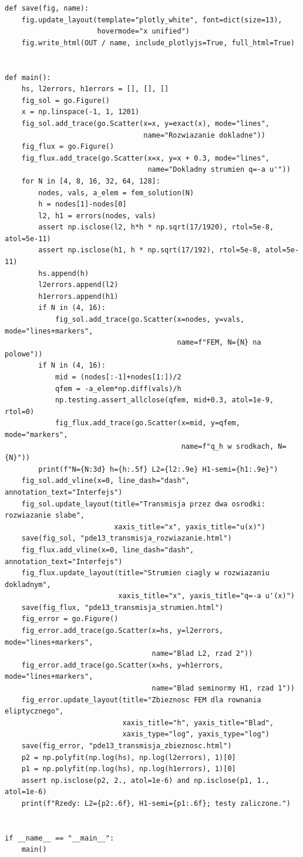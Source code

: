 \begin{lstlisting}[style=pythonpde,caption={Transmisja i zbieżność metody Galerkina (Plotly)},label={code:pde13-transmission}]
def save(fig, name):
    fig.update_layout(template="plotly_white", font=dict(size=13),
                      hovermode="x unified")
    fig.write_html(OUT / name, include_plotlyjs=True, full_html=True)


def main():
    hs, l2errors, h1errors = [], [], []
    fig_sol = go.Figure()
    x = np.linspace(-1, 1, 1201)
    fig_sol.add_trace(go.Scatter(x=x, y=exact(x), mode="lines",
                                 name="Rozwiazanie dokladne"))
    fig_flux = go.Figure()
    fig_flux.add_trace(go.Scatter(x=x, y=x + 0.3, mode="lines",
                                  name="Dokladny strumien q=-a u'"))
    for N in [4, 8, 16, 32, 64, 128]:
        nodes, vals, a_elem = fem_solution(N)
        h = nodes[1]-nodes[0]
        l2, h1 = errors(nodes, vals)
        assert np.isclose(l2, h*h * np.sqrt(17/1920), rtol=5e-8, atol=5e-11)
        assert np.isclose(h1, h * np.sqrt(17/192), rtol=5e-8, atol=5e-11)
        hs.append(h)
        l2errors.append(l2)
        h1errors.append(h1)
        if N in (4, 16):
            fig_sol.add_trace(go.Scatter(x=nodes, y=vals, mode="lines+markers",
                                         name=f"FEM, N={N} na polowe"))
        if N in (4, 16):
            mid = (nodes[:-1]+nodes[1:])/2
            qfem = -a_elem*np.diff(vals)/h
            np.testing.assert_allclose(qfem, mid+0.3, atol=1e-9, rtol=0)
            fig_flux.add_trace(go.Scatter(x=mid, y=qfem, mode="markers",
                                          name=f"q_h w srodkach, N={N}"))
        print(f"N={N:3d} h={h:.5f} L2={l2:.9e} H1-semi={h1:.9e}")
    fig_sol.add_vline(x=0, line_dash="dash", annotation_text="Interfejs")
    fig_sol.update_layout(title="Transmisja przez dwa osrodki: rozwiazanie slabe",
                          xaxis_title="x", yaxis_title="u(x)")
    save(fig_sol, "pde13_transmisja_rozwiazanie.html")
    fig_flux.add_vline(x=0, line_dash="dash", annotation_text="Interfejs")
    fig_flux.update_layout(title="Strumien ciagly w rozwiazaniu dokladnym",
                           xaxis_title="x", yaxis_title="q=-a u'(x)")
    save(fig_flux, "pde13_transmisja_strumien.html")
    fig_error = go.Figure()
    fig_error.add_trace(go.Scatter(x=hs, y=l2errors, mode="lines+markers",
                                   name="Blad L2, rzad 2"))
    fig_error.add_trace(go.Scatter(x=hs, y=h1errors, mode="lines+markers",
                                   name="Blad seminormy H1, rzad 1"))
    fig_error.update_layout(title="Zbieznosc FEM dla rownania eliptycznego",
                            xaxis_title="h", yaxis_title="Blad",
                            xaxis_type="log", yaxis_type="log")
    save(fig_error, "pde13_transmisja_zbieznosc.html")
    p2 = np.polyfit(np.log(hs), np.log(l2errors), 1)[0]
    p1 = np.polyfit(np.log(hs), np.log(h1errors), 1)[0]
    assert np.isclose(p2, 2., atol=1e-6) and np.isclose(p1, 1., atol=1e-6)
    print(f"Rzedy: L2={p2:.6f}, H1-semi={p1:.6f}; testy zaliczone.")


if __name__ == "__main__":
    main()
\end{lstlisting}

